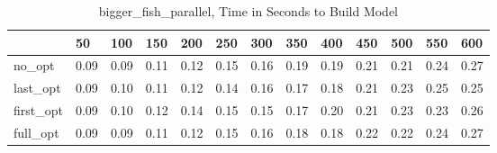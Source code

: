 \begin{table}
\caption{bigger\_fish\_parallel, Time in Seconds to Build Model}
\label{bigger_fish_parallel_model_time}
\begin{tabular}{lllllllllllll}
\toprule
 & 50 & 100 & 150 & 200 & 250 & 300 & 350 & 400 & 450 & 500 & 550 & 600 \\
\midrule
no\_opt & 0.09 & 0.09 & 0.11 & 0.12 & 0.15 & 0.16 & 0.19 & 0.19 & 0.21 & 0.21 & 0.24 & 0.27 \\
last\_opt & 0.09 & 0.10 & 0.11 & 0.12 & 0.14 & 0.16 & 0.17 & 0.18 & 0.21 & 0.23 & 0.25 & 0.25 \\
first\_opt & 0.09 & 0.10 & 0.12 & 0.14 & 0.15 & 0.15 & 0.17 & 0.20 & 0.21 & 0.23 & 0.23 & 0.26 \\
full\_opt & 0.09 & 0.09 & 0.11 & 0.12 & 0.15 & 0.16 & 0.18 & 0.18 & 0.22 & 0.22 & 0.24 & 0.27 \\
\bottomrule
\end{tabular}
\end{table}
